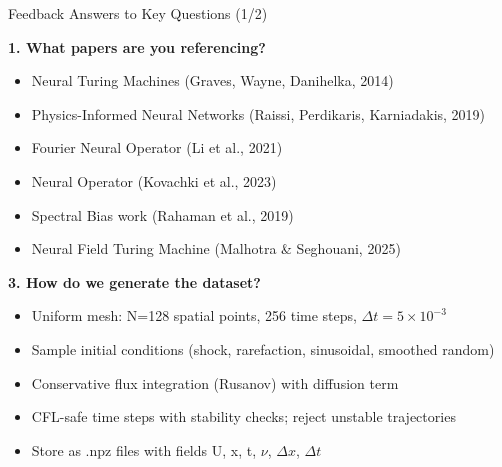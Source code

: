 \begin{frame}{Feedback}
    \small
    \textcolor{red_unipd}{\Large Answers to Key Questions (1/2)}
    \vspace{0.3em}

    \scriptsize
    \textbf{1. What papers are you referencing?}
    \begin{itemize}
        \item Neural Turing Machines (Graves, Wayne, Danihelka, 2014)
        \item Physics-Informed Neural Networks (Raissi, Perdikaris, Karniadakis, 2019)
        \item Fourier Neural Operator (Li et al., 2021)
        \item Neural Operator (Kovachki et al., 2023)
        \item Spectral Bias work (Rahaman et al., 2019)
        \item Neural Field Turing Machine (Malhotra \& Seghouani, 2025)
    \end{itemize}

    \vspace{0.5em}
    \textbf{3. How do we generate the dataset?}
    \begin{itemize}
        \item Uniform mesh: N=128 spatial points, 256 time steps, $\Delta t=5\times10^{-3}$
        \item Sample initial conditions (shock, rarefaction, sinusoidal, smoothed random)
        \item Conservative flux integration (Rusanov) with diffusion term
        \item CFL-safe time steps with stability checks; reject unstable trajectories
        \item Store as .npz files with fields U, x, t, $\nu$, $\Delta x$, $\Delta t$
    \end{itemize}
\end{frame}

